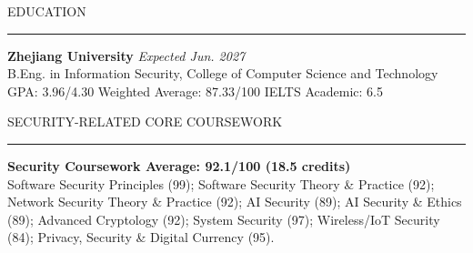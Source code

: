 \documentclass{resume} %
\renewenvironment{rSection}[1]{
\sectionskip
\textcolor{CarnegieMellonRed}{\MakeUppercase{#1}}
\sectionlineskip
\hrule
\begin{list}{}{\setlength{\leftmargin}{1.5em}}
\item[]
}{\end{list}}
\begin{document}
\begin{rSection}{Education}
\textbf{Zhejiang University} \hfill \textit{Expected Jun. 2027}\\
B.Eng. in Information Security, College of Computer Science and Technology\\
GPA: 3.96/4.30 \quad Weighted Average: 87.33/100 \quad IELTS Academic: 6.5
\end{rSection}

\begin{rSection}{Security-Related Core Coursework}
\textbf{Security Coursework Average: 92.1/100 (18.5 credits)}\\
\small Software Security Principles (99); Software Security Theory \& Practice (92); Network Security Theory \& Practice (92); AI Security (89); AI Security \& Ethics (89); Advanced Cryptology (92); System Security (97); Wireless/IoT Security (84); Privacy, Security \& Digital Currency (95).\normalsize
\end{rSection}
\end{document}
